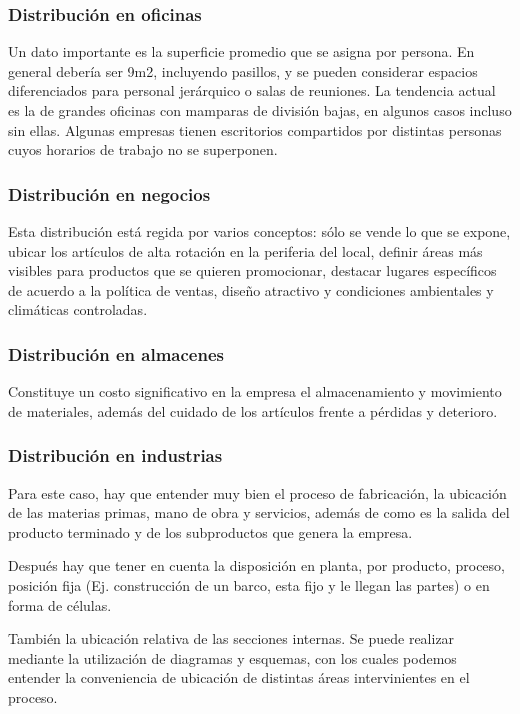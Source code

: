 \documentclass[titlepage,a4paper]{article}
\begin{document}
\subsubsection*{Distribución en oficinas}
Un dato importante es la superficie promedio que se asigna por persona. En general debería ser 9m2, incluyendo pasillos, y se pueden considerar espacios diferenciados para personal jerárquico o salas de reuniones. La tendencia actual es la de grandes oficinas con mamparas de división bajas, en algunos casos incluso sin ellas. Algunas empresas tienen escritorios compartidos por distintas personas cuyos horarios de trabajo no se superponen.

\subsubsection*{Distribución en negocios}
Esta distribución está regida por varios conceptos: sólo se vende lo que se expone, ubicar los artículos de alta rotación en la periferia del local, definir áreas más visibles para productos que se quieren promocionar, destacar lugares específicos de acuerdo a la política de ventas, diseño atractivo y condiciones ambientales y climáticas controladas.

\subsubsection*{Distribución en almacenes}
Constituye un costo significativo en la empresa el almacenamiento y movimiento de materiales, además del cuidado de los artículos frente a pérdidas y deterioro.

\subsubsection*{Distribución en industrias}
Para este caso, hay que entender muy bien el proceso de fabricación, la ubicación de las materias primas, mano de obra y servicios, además de como es la salida del producto terminado y de los subproductos que genera la empresa.

Después hay que tener en cuenta la disposición en planta, por producto, proceso, posición fija (Ej. construcción de un barco, esta fijo y le llegan las partes) o en forma de células.

También la ubicación relativa de las secciones internas. Se puede realizar mediante la utilización de diagramas y esquemas, con los cuales podemos entender la conveniencia de ubicación de distintas áreas intervinientes en el proceso.
\end{document}
